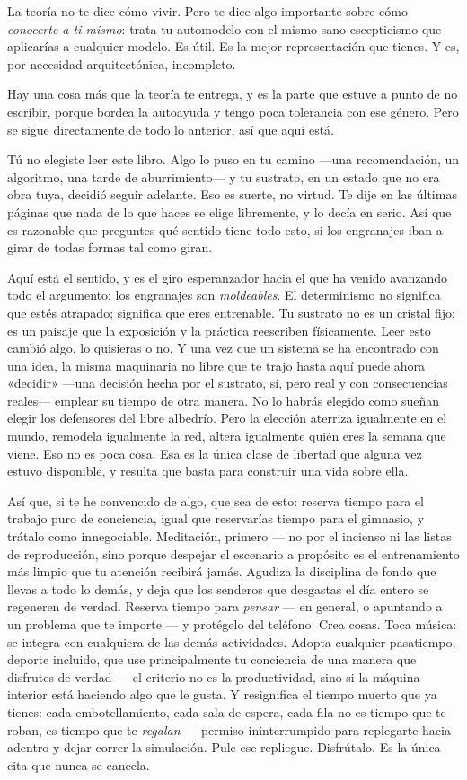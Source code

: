 \documentclass[11pt, twoside, openright]{book}
\begin{document}
La teoría no te dice cómo vivir. Pero te dice algo importante sobre cómo \textit{conocerte a ti mismo}: trata tu automodelo con el mismo sano escepticismo que aplicarías a cualquier modelo. Es útil. Es la mejor representación que tienes. Y es, por necesidad arquitectónica, incompleto.

Hay una cosa más que la teoría te entrega, y es la parte que estuve a punto de no escribir, porque bordea la autoayuda y tengo poca tolerancia con ese género. Pero se sigue directamente de todo lo anterior, así que aquí está.

Tú no elegiste leer este libro. Algo lo puso en tu camino ---una recomendación, un algoritmo, una tarde de aburrimiento--- y tu sustrato, en un estado que no era obra tuya, decidió seguir adelante. Eso es suerte, no virtud. Te dije en las últimas páginas que nada de lo que haces se elige libremente, y lo decía en serio. Así que es razonable que preguntes qué sentido tiene todo esto, si los engranajes iban a girar de todas formas tal como giran.

Aquí está el sentido, y es el giro esperanzador hacia el que ha venido avanzando todo el argumento: los engranajes son \textit{moldeables}. El determinismo no significa que estés atrapado; significa que eres entrenable. Tu sustrato no es un cristal fijo: es un paisaje que la exposición y la práctica reescriben físicamente. Leer esto cambió algo, lo quisieras o no. Y una vez que un sistema se ha encontrado con una idea, la misma maquinaria no libre que te trajo hasta aquí puede ahora «decidir» ---una decisión hecha por el sustrato, sí, pero real y con consecuencias reales--- emplear su tiempo de otra manera. No lo habrás elegido como sueñan elegir los defensores del libre albedrío. Pero la elección aterriza igualmente en el mundo, remodela igualmente la red, altera igualmente quién eres la semana que viene. Eso no es poca cosa. Esa es la única clase de libertad que alguna vez estuvo disponible, y resulta que basta para construir una vida sobre ella.

Así que, si te he convencido de algo, que sea de esto: reserva tiempo para el trabajo puro de conciencia, igual que reservarías tiempo para el gimnasio, y trátalo como innegociable. Meditación, primero --- no por el incienso ni las listas de reproducción, sino porque despejar el escenario a propósito es el entrenamiento más limpio que tu atención recibirá jamás. Agudiza la disciplina de fondo que llevas a todo lo demás, y deja que los senderos que desgastas el día entero se regeneren de verdad. Reserva tiempo para \textit{pensar} --- en general, o apuntando a un problema que te importe --- y protégelo del teléfono. Crea cosas. Toca música: se integra con cualquiera de las demás actividades. Adopta cualquier pasatiempo, deporte incluido, que use principalmente tu conciencia de una manera que disfrutes de verdad --- el criterio no es la productividad, sino si la máquina interior está haciendo algo que le gusta. Y resignifica el tiempo muerto que ya tienes: cada embotellamiento, cada sala de espera, cada fila no es tiempo que te roban, es tiempo que te \textit{regalan} --- permiso ininterrumpido para replegarte hacia adentro y dejar correr la simulación. Pule ese repliegue. Disfrútalo. Es la única cita que nunca se cancela.
\end{document}
